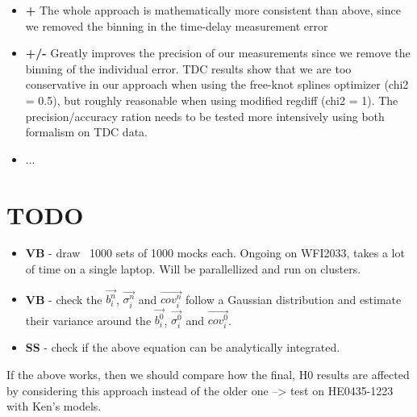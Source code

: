 \documentclass[11pt]{scrartcl}
\renewcommand{\vec}{\overrightarrow}  %
\begin{document}
\begin{itemize}
 \item \textbf{+} The whole approach is mathematically more consistent 
than above, since we removed the binning in the time-delay measurement 
error
 \item \textbf{+/-} Greatly improves the precision of our measurements 
since we remove the binning of the individual error. TDC results show 
that we are too conservative in our approach when using the free-knot 
splines optimizer (chi2 = 0.5), but roughly reasonable when using 
modified regdiff (chi2 = 1). The precision/accuracy ration needs to be 
tested more intensively using both formalism on TDC data.
 \item ...
\end{itemize}


\section{TODO}
\begin{itemize}
 \item \textbf{VB} - draw ~1000 sets of 1000 mocks each. Ongoing on 
WFI2033, takes a lot of time on a single laptop. Will be 
parallellized and run on clusters.
 \item \textbf{VB} - check the $\vec{b^n_i}$, $\vec{\sigma^n_i}$ and 
$\vec{cov^n_i}$ follow a Gaussian distribution and estimate their 
variance around the $\vec{b^0_i}$, $\vec{\sigma^0_i}$ and 
$\vec{cov^0_i}$.
 \item \textbf{SS} - check if the above equation can be 
analytically integrated.
 
\end{itemize}

If the above works, then we should compare how the final, H0 results 
are affected by considering this approach instead of the older one --> 
test on HE0435-1223 with Ken's models.
\end{document}
